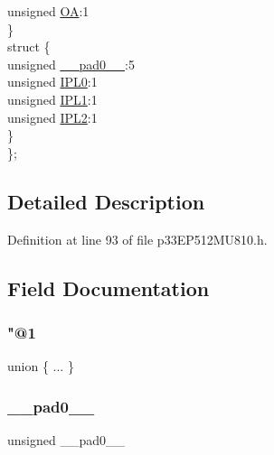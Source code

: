 \begin{DoxyCompactItemize}
\begin{tabbing}
\>\>unsigned \hyperlink{structtag_s_r_b_i_t_s_aa7c1567e2ff63ebed1e7dbc740bae217}{OA}:1\\
\>\} \\
\>struct \{\\
\>\>unsigned \hyperlink{structtag_s_r_b_i_t_s_adf71f3d8410c1f1dbbc96680a92c49af}{\_\_pad0\_\_}:5\\
\>\>unsigned \hyperlink{structtag_s_r_b_i_t_s_ad49ce1701a089b95b04909b69bf3efda}{IPL0}:1\\
\>\>unsigned \hyperlink{structtag_s_r_b_i_t_s_a1185701de24a41c1c48bbc80abf6f4c3}{IPL1}:1\\
\>\>unsigned \hyperlink{structtag_s_r_b_i_t_s_acb4690bf4851cecce148678847af643a}{IPL2}:1\\
\>\} \\
\}; \\

\end{tabbing}\end{DoxyCompactItemize}


\subsection{Detailed Description}


Definition at line 93 of file p33\+E\+P512\+M\+U810.\+h.



\subsection{Field Documentation}
\mbox{\label{structtag_s_r_b_i_t_s_a9c7dfa01789ced07841f308ea07d856c}} 
\subsubsection{\texorpdfstring{"@1}{@1}}
{\footnotesize\ttfamily union \{ ... \} }

\mbox{\label{structtag_s_r_b_i_t_s_adf71f3d8410c1f1dbbc96680a92c49af}} 
\subsubsection{\texorpdfstring{\+\_\+\+\_\+pad0\+\_\+\+\_\+}{\_\_pad0\_\_}}
{\footnotesize\ttfamily unsigned \+\_\+\+\_\+pad0\+\_\+\+\_\+}



